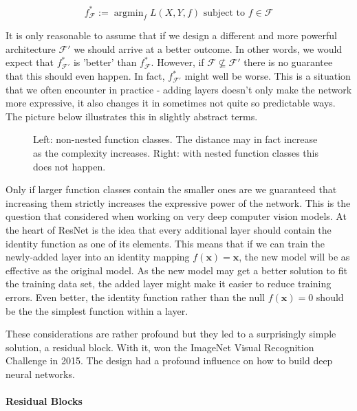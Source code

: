 $$f^*_\mathcal{F} := \mathop{\mathrm{argmin}}_f L(X, Y, f) \text{ subject to } f \in \mathcal{F}$$

It is only reasonable to assume that if we design a different and more powerful architecture $\mathcal{F}'$ we should arrive at a better outcome. In other words, we would expect that $f^*_{\mathcal{F}'}$ is 'better' than $f^*_{\mathcal{F}}$. However, if $\mathcal{F} \not\subseteq \mathcal{F}'$ there is no guarantee that this should even happen. In fact, $f^*_{\mathcal{F}'}$ might well be worse. This is a situation that we often encounter in practice - adding layers doesn't only make the network more expressive, it also changes it in sometimes not quite so predictable ways. The picture below illustrates this in slightly abstract terms.

\begin{figure}[hpt]
	\centering
	
	\caption{Left: non-nested function classes. The distance may in fact increase as the complexity increases. Right: with nested function classes this does not happen.}
	\label{fig:functionclasses}
\end{figure}


Only if larger function classes contain the smaller ones are we guaranteed that increasing them strictly increases the expressive power of the network. This is the question that \cite{He2016resnet} considered when working on very deep computer vision models. At the heart of ResNet is the idea that every additional layer should contain the identity function as one of its elements. This means that if we can train the newly-added layer into an identity mapping $f(\mathbf{x}) = \mathbf{x}$, the new model will be as effective as the original model. As the new model may get a better solution to fit the training data set, the added layer might make it easier to reduce training errors. Even better, the identity function rather than the null $f(\mathbf{x}) = 0$ should be the the simplest function within a layer.

These considerations are rather profound but they led to a surprisingly simple solution, a residual block. With it, \citet{He2016resnet} won the ImageNet Visual Recognition Challenge in 2015. The design had a profound influence on how to build deep neural networks.

\paragraph{Residual Blocks}


